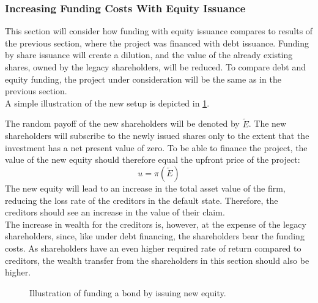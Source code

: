 \documentclass[main.tex]{subfiles}
\begin{document}
    \subsubsection{Increasing Funding Costs With Equity Issuance}
    \label{sec:example-equity-issuance}
        This section will consider how funding with equity issuance
        compares to results of the previous section, where the project was financed with debt issuance.
        Funding by share issuance will create a dilution, and the value of the already existing shares, owned by the legacy shareholders, will be reduced. 
        To compare debt and equity funding, 
        the project under consideration will be the same as in the previous section.
        \\
        A simple illustration of the new setup is depicted in \cref{fig:equity-issuance-setup}.

        The random payoff of the new shareholders will be denoted by $\tilde{E}$.
        The new shareholders will subscribe to the newly issued shares 
        only to the extent that the investment has a net present value of zero.
        To be able to finance the project, the value of the new equity
        should therefore equal the upfront price of the project:
        \begin{equation*}
            u = \pi(\tilde{E})
        \end{equation*}
        The new equity will lead to an increase in the total asset value of the firm,
        reducing the loss rate of the creditors in the default state.
        Therefore, the creditors should see an increase in the value of their claim.\\
        The increase in wealth for the creditors is, however, at the expense of the legacy shareholders,
        since, like under debt financing, the shareholders bear the funding costs.
        As shareholders have an even higher required rate of return compared to creditors,
        the wealth transfer from the shareholders in this section should also be higher.
        \begin{figure}[t]
            \centering
            \caption{Illustration of funding a bond by issuing new equity.}
            \label{fig:equity-issuance-setup}
        \end{figure}
\end{document}
